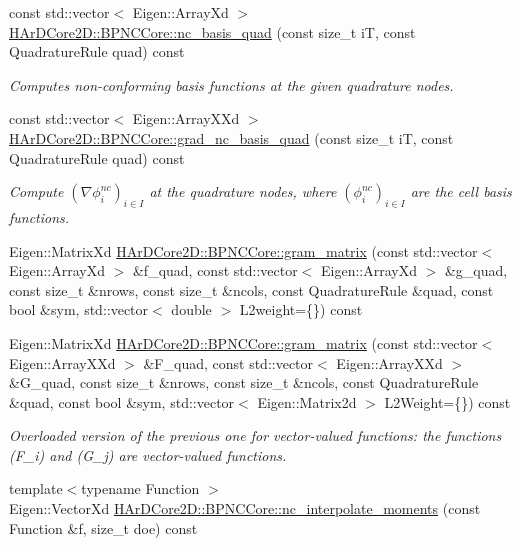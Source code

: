 \begin{DoxyCompactItemize}
const std\+::vector$<$ Eigen\+::\+Array\+Xd $>$ \hyperlink{group__BPNC_gadab9f7a9f6d42f729a8dce8e358e4d00}{H\+Ar\+D\+Core2\+D\+::\+B\+P\+N\+C\+Core\+::nc\+\_\+basis\+\_\+quad} (const size\+\_\+t iT, const Quadrature\+Rule quad) const
\begin{DoxyCompactList}\small\item\em Computes non-\/conforming basis functions at the given quadrature nodes. \end{DoxyCompactList}\item 
const std\+::vector$<$ Eigen\+::\+Array\+X\+Xd $>$ \hyperlink{group__BPNC_gab7cc52dd5f725b057ec52cca573bf15f}{H\+Ar\+D\+Core2\+D\+::\+B\+P\+N\+C\+Core\+::grad\+\_\+nc\+\_\+basis\+\_\+quad} (const size\+\_\+t iT, const Quadrature\+Rule quad) const
\begin{DoxyCompactList}\small\item\em Compute $(\nabla \phi_i^{nc})_{i\in I}$ at the quadrature nodes, where $(\phi_i^{nc})_{i\in I}$ are the cell basis functions. \end{DoxyCompactList}\item 
Eigen\+::\+Matrix\+Xd \hyperlink{group__BPNC_gaa3150fe82adc0be190b698e1b17f6bc8}{H\+Ar\+D\+Core2\+D\+::\+B\+P\+N\+C\+Core\+::gram\+\_\+matrix} (const std\+::vector$<$ Eigen\+::\+Array\+Xd $>$ \&f\+\_\+quad, const std\+::vector$<$ Eigen\+::\+Array\+Xd $>$ \&g\+\_\+quad, const size\+\_\+t \&nrows, const size\+\_\+t \&ncols, const Quadrature\+Rule \&quad, const bool \&sym, std\+::vector$<$ double $>$ L2weight=\{\}) const
\item 
Eigen\+::\+Matrix\+Xd \hyperlink{group__BPNC_gaf92e85c265e2138324347e02c2b7847f}{H\+Ar\+D\+Core2\+D\+::\+B\+P\+N\+C\+Core\+::gram\+\_\+matrix} (const std\+::vector$<$ Eigen\+::\+Array\+X\+Xd $>$ \&F\+\_\+quad, const std\+::vector$<$ Eigen\+::\+Array\+X\+Xd $>$ \&G\+\_\+quad, const size\+\_\+t \&nrows, const size\+\_\+t \&ncols, const Quadrature\+Rule \&quad, const bool \&sym, std\+::vector$<$ Eigen\+::\+Matrix2d $>$ L2\+Weight=\{\}) const
\begin{DoxyCompactList}\small\item\em Overloaded version of the previous one for vector-\/valued functions\+: the functions (F\+\_\+i) and (G\+\_\+j) are vector-\/valued functions. \end{DoxyCompactList}\item 
\mbox{\label{group__BPNC_ga25153a400e70dd231c4c29f0f72f9f4d}} 
{\footnotesize template$<$typename Function $>$ }\\Eigen\+::\+Vector\+Xd \hyperlink{group__BPNC_ga25153a400e70dd231c4c29f0f72f9f4d}{H\+Ar\+D\+Core2\+D\+::\+B\+P\+N\+C\+Core\+::nc\+\_\+interpolate\+\_\+moments} (const Function \&f, size\+\_\+t doe) const

\end{DoxyCompactItemize}
